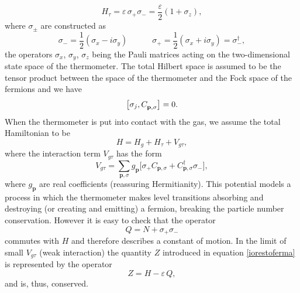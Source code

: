 \documentclass[twocolumn,usenatbib]{mnras2}
\newcommand{\vect}[1]{\mathbf{{#1}}}
\newcommand{\spc}{\quad \quad \quad}
\begin{document}
\begin{equation}
H_\tau = \varepsilon \, \sigma_+ \sigma_- = \dfrac{\varepsilon}{2}(1+\sigma_z),
\end{equation}
where $\sigma_\pm$ are constructed as
\begin{equation}
  \sigma_- = \dfrac{1}{2} (\sigma_x -i\sigma_y)  \spc  \sigma_+ =\dfrac{1}{2} (\sigma_x +i\sigma_y) = \sigma_-^\dagger,
\end{equation}
the operators $\sigma_x$, $\sigma_y$, $\sigma_z$ being the Pauli matrices acting on the two-dimensional state space of the thermometer. The total Hilbert space is assumed to be the tensor product between the space of the thermometer and the Fock space of the fermions and we have 
\begin{equation}
\comm{\sigma_j}{C_{\vect{p},\sigma}^{\textcolor{white}{\dagger}}}=0.
\end{equation}
When the thermometer is put into contact with the gas, we assume the total Hamiltonian to be
\begin{equation}
H = H_g + H_\tau + V_{g\tau},
\end{equation} 
where the interaction term $V_{g\tau}$ has the form
\begin{equation}
V_{g\tau}= \sum_{\vect{p},\sigma} g_{\vect{p}} \bigg[ \sigma_+ C_{\vect{p},\sigma} + C^\dagger_{\vect{p},\sigma} \sigma_- \bigg],
\end{equation}
where $g_\vect{p}$ are real coefficients (reassuring Hermitianity). This potential models a process in which the thermometer makes level transitions absorbing and destroying (or creating and emitting) a fermion, breaking the particle number conservation. However it is easy to check that the operator
\begin{equation}
Q =  N + \sigma_+ \sigma_- 
\end{equation} 
commutes with $H$ and therefore describes a constant of motion. In the limit of small $V_{g\tau}$ (weak interaction) the quantity $Z$ introduced in equation \eqref{iorestoferma} is represented by the operator
\begin{equation}
Z= H-\varepsilon \, Q,
\end{equation}
and is, thus, conserved. 
\end{document}
